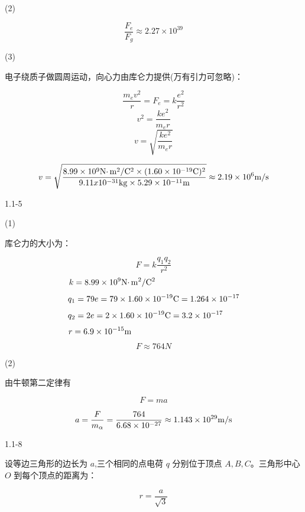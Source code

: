 \documentclass{article}
\begin{document}
(2)

$$\frac{F_e}{F_g} \approx 2.27 \times 10^{39}$$

(3)

电子绕质子做圆周运动，向心力由库仑力提供(万有引力可忽略)：

$$\frac{m_e v^2}{r} = F_e = k \frac{e^2}{r^2}$$
$$v^2 = \frac{k e^2}{m_e r}$$
$$v=\sqrt{\frac{k e^2}{m_e r}}$$

$$v= \sqrt{\frac{8.99\times10^9\rm{N}\cdotp \rm{m}^2/ \rm{C}^2\times(1.60\times10^{-19}\rm{C})^2}{9.11x10^{-31}\rm{kg} \times 5.29\times10^{-11}\rm{m}}} \approx 2.19 \times 10^{6} \rm{m}/\rm{s}$$











\newpage



1.1-5

(1)

库仑力的大小为：

$$F=k\frac{q_1q_2}{r^2}$$
$$k=8.99\times10^9\rm{N}\cdotp \rm{m}^2/ \rm{C}^2\qquad\qquad\qquad\qquad\qquad$$
$$ q_1=79e=79\times1.60\times10^{-19}\rm{C}=1.264\times10^{-17}$$
$$q_2=2e=2\times1.60\times10^{-19}\rm{C}=3.2\times10^{-17}\qquad $$
$$  r=6.9\times10^{-15}\rm{m}\qquad\qquad\qquad\qquad\qquad\qquad\quad$$
$$F\approx 764N$$

(2)


由牛顿第二定律有

$$F=ma$$

$$a = \frac{F}{m_\alpha} = \frac{764}{6.68 \times 10^{-27}}\approx 1.143 \times 10^{29} \rm{m}/\rm{s}$$


\newpage

1.1-8

设等边三角形的边长为 $a$,三个相同的点电荷 $q$ 分别位于顶点 $A, B, C$。三角形中心 $O$ 到每个顶点的距离为：

$$r = \frac{a}{\sqrt{3}}$$
\end{document}
